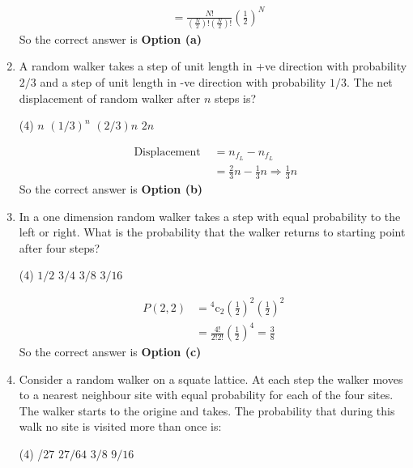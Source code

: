 \begin{enumerate}
\begin{answer}
\begin{align*}
		&=\frac{N !}{\left(\frac{N}{2}\right) !\left(\frac{N}{2}\right) !}\left(\frac{1}{2}\right)^{N}
		\end{align*}
		So the correct answer is \textbf{Option (a)}
	\end{answer}
	\item A random walker takes a step of unit length in +ve direction with probability $2/3$ and a step of unit length in -ve direction with probability $1/3$. The net displacement of random walker after $n$ steps is?
	\begin{tasks}(4)
		\task[\textbf{a.}]$n$
		\task[\textbf{b.}]$(1 / 3)^{n}$
		\task[\textbf{c.}]$(2 / 3) n$
		\task[\textbf{d.}]$2 n$
	\end{tasks}
	\begin{answer}
		\begin{align*}
		\text { Displacement } &=n_{f_{L}}-n_{f_{L}} \\
		&=\frac{2}{3} n-\frac{1}{3} n \Rightarrow \frac{1}{3} n
		\end{align*}
		So the correct answer is \textbf{Option (b)}
	\end{answer}
	\item In a one dimension random walker takes a step with equal probability to the left or right. What is the probability that the walker returns to starting point after four steps?
	\begin{tasks}(4)
		\task[\textbf{a.}]$1 / 2$
		\task[\textbf{b.}]$3 / 4$
		\task[\textbf{c.}]$3 / 8$
		\task[\textbf{d.}] $3 / 16$ 
	\end{tasks}
	\begin{answer}
		\begin{align*}
		P(2,2) &={ }^{4} \mathrm{c}_{2}\left(\frac{1}{2}\right)^{2}\left(\frac{1}{2}\right)^{2} \\
		&=\frac{4 !}{2 ! 2 !}\left(\frac{1}{2}\right)^{4}=\frac{3}{8}
		\end{align*}
		So the correct answer is \textbf{Option (c)}
	\end{answer}
	\item Consider a random walker on a squate lattice. At each step the walker moves to a nearest neighbour site with equal probability for each of the four sites.  The walker starts to the origine and takes. The probability that during this walk no site is visited more than once is:
	\begin{tasks}(4)
		/27
		\task[\textbf{b.}]$27 / 64$
		\task[\textbf{c.}]$3 / 8$
		\task[\textbf{d.}]$9 / 16$ 
	\end{tasks}

\end{enumerate}
